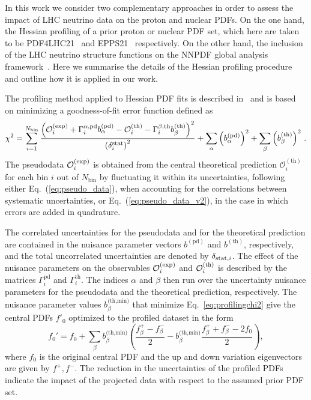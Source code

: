 In this work we consider two complementary approaches in order to assess the
impact of LHC neutrino data on the proton and nuclear PDFs.
%
On the one hand, the Hessian profiling of a prior proton or
nuclear PDF set, which here are taken to be PDF4LHC21~\cite{PDF4LHCWorkingGroup:2022cjn} and
EPPS21~\cite{Eskola:2021nhw} respectively.
%
On the other hand, the inclusion of the LHC neutrino structure functions
on the NNPDF global analysis framework~\cite{NNPDF:2021uiq,NNPDF:2021njg}.
%
Here we summarise the details of the Hessian profiling procedure and
outline how it is applied in our work.

The profiling method applied to Hessian PDF fits is described in~\cite{Paukkunen:2014zia, Schmidt:2018hvu, AbdulKhalek:2018rok, HERAFitterdevelopersTeam:2015cre} and is based
on minimizing a goodness-of-fit error function defined as
\begin{equation}
\chi^2 = 
\sum_{i=1}^{N_{\textrm{bin}}} 
{{\left(  \mathcal{O}_i^{\rm (exp)}
            + \Gamma_i^{\alpha,\textrm{pd}}
              b_\alpha^{\textrm{(pd)}}
            - \mathcal{O}_i^{\rm (th)}
            - \Gamma_i^{\beta,\textrm{th}}
              b_\beta^{(\textrm{th})}
     \right)^2
     }\over { \left(\delta_i^{\rm stat}\right)^2 }}
+ \sum_\alpha \left( b_\alpha^{(\textrm{pd})}\right)^2
+ \sum_\beta  \left( b_\beta^{\textrm{(th)}}\right) ^2 \, .
\label{eq:profilingchi2}
\end{equation}
The pseudodata 
$\mathcal{O}_i^{\rm (exp)}$ 
is obtained from the central theoretical prediction 
$\mathcal{O}_i^{(\textrm{th})}$
for each bin $i$ out of $N_{\textrm{bin}}$ by fluctuating
it within its uncertainties, following either
Eq.~(\ref{eq:pseudo_data}), when accounting for the correlations
between systematic uncertainties, or Eq.~(\ref{eq:pseudo_data_v2}),
in the case in which errors are added in quadrature.

The correlated uncertainties for the pseudodata and for the theoretical prediction 
are contained in the nuisance parameter vectors $b^{(\textrm{pd})}$ and $b^{(\textrm{th})}$, respectively, and the total uncorrelated uncertainties are denoted by $\delta_{{\rm stat},i}$.
%
The effect of the nuisance parameters
on the observables $\mathcal{O}_i^{\rm (exp)}$ and $\mathcal{O}_i^{\rm (th)}$
is described by the matrices $\Gamma_i^{\textrm{pd}}$ and $\Gamma_i^{\textrm{th}}$.
%
The indices $\alpha$ and $\beta$ then run over the uncertainty nuisance parameters for the pseudodata and the theoretical prediction, respectively.
%
The nuisance parameter values $b_\beta^{\textrm{(th,min)}}$ that minimize Eq.~\eqref{eq:profilingchi2} give the central PDFs $f'_0$ optimized to the profiled dataset in the form
\begin{equation}
f_0' = f_0
      + \sum_\beta b_\beta^{\textrm{(th,min)}} 
        \left(  \frac{f_\beta^+   -  f_\beta^- }{2}
              -    b_\beta^{\textrm{(th,min)}}
                \frac{f_\beta^+ + f_\beta^- - 2f_0}{2}
        \right),
\end{equation}
where $f_0$ is the original central PDF and the up and down variation eigenvectors are given by $f^+, f^-$.
%
The reduction in the uncertainties of the profiled PDFs indicate the impact
of the projected data with respect to the assumed prior PDF set.


